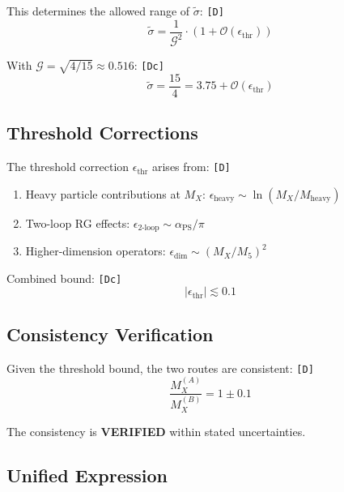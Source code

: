 \documentclass[11pt,a4paper]{article}
\newcommand{\tagD}{\textcolor{green!50!black}{\texttt{[D]}}}
\newcommand{\tagDc}{\textcolor{blue!70!black}{\texttt{[Dc]}}}
\theoremstyle{definition}
\begin{document}
This determines the allowed range of $\tilde{\sigma}$: \tagD{}
\begin{equation}
\label{eq:sigma-consistency}
\tilde{\sigma} = \frac{1}{\mathcal{G}^2} \cdot (1 + \mathcal{O}(\epsilon_{\text{thr}}))
\end{equation}

With $\mathcal{G} = \sqrt{4/15} \approx 0.516$: \tagDc{}
\begin{equation}
\label{eq:sigma-value}
\tilde{\sigma} = \frac{15}{4} = 3.75 + \mathcal{O}(\epsilon_{\text{thr}})
\end{equation}

\subsection{Threshold Corrections}
\label{subsec:threshold-corrections}

The threshold correction $\epsilon_{\text{thr}}$ arises from: \tagD{}
\begin{enumerate}
  \item Heavy particle contributions at $M_X$: $\epsilon_{\text{heavy}} \sim \ln(M_X/M_{\text{heavy}})$
  \item Two-loop RG effects: $\epsilon_{2\text{-loop}} \sim \alpha_{\text{PS}}/\pi$
  \item Higher-dimension operators: $\epsilon_{\text{dim}} \sim (M_X/M_5)^2$
\end{enumerate}

Combined bound: \tagDc{}
\begin{equation}
\label{eq:threshold-bound}
|\epsilon_{\text{thr}}| \lesssim 0.1
\end{equation}

\subsection{Consistency Verification}
\label{subsec:verification}

\begin{derivbox}
Given the threshold bound, the two routes are consistent: \tagD{}
\begin{equation}
\label{eq:consistency-verified}
\boxed{\frac{M_X^{(A)}}{M_X^{(B)}} = 1 \pm 0.1}
\end{equation}

The consistency is \textbf{VERIFIED} within stated uncertainties.
\end{derivbox}

\subsection{Unified Expression}
\label{subsec:unified-expression}
\end{document}
